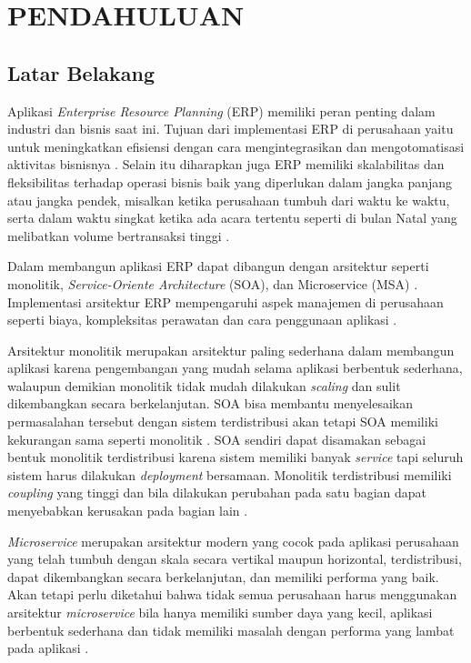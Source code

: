 \chapter{PENDAHULUAN}
\section{Latar Belakang}
Aplikasi \textit{Enterprise Resource Planning} (ERP) memiliki peran penting dalam industri dan bisnis saat ini. Tujuan dari implementasi ERP di perusahaan yaitu untuk meningkatkan efisiensi dengan cara mengintegrasikan dan mengotomatisasi aktivitas bisnisnya \cite{612}. Selain itu diharapkan juga ERP memiliki skalabilitas dan fleksibilitas terhadap operasi bisnis baik yang diperlukan dalam jangka panjang atau jangka pendek, misalkan ketika perusahaan tumbuh dari waktu ke waktu, serta dalam waktu singkat ketika ada acara tertentu seperti di bulan Natal yang melibatkan volume bertransaksi tinggi \cite{D94}.

Dalam membangun aplikasi ERP dapat dibangun dengan arsitektur seperti monolitik, \textit{Service-Oriente Architecture} (SOA), dan Microservice (MSA) \cite{5FA}. Implementasi arsitektur ERP mempengaruhi aspek manajemen di perusahaan seperti biaya, kompleksitas perawatan dan cara penggunaan aplikasi \cite{612}.

Arsitektur monolitik merupakan arsitektur paling sederhana dalam membangun aplikasi karena pengembangan yang mudah selama aplikasi berbentuk sederhana, walaupun demikian monolitik tidak mudah dilakukan \textit{scaling} dan sulit dikembangkan secara berkelanjutan. SOA bisa membantu menyelesaikan permasalahan tersebut dengan sistem terdistribusi akan tetapi SOA memiliki kekurangan sama seperti monolitik \cite{5FA}. SOA sendiri dapat disamakan sebagai bentuk monolitik terdistribusi karena sistem memiliki banyak \textit{service} tapi seluruh sistem harus dilakukan \textit{deployment} bersamaan. Monolitik terdistribusi memiliki  \textit{coupling} yang tinggi dan bila dilakukan perubahan pada satu bagian dapat menyebabkan kerusakan pada bagian lain \cite{74C}.

\textit{Microservice} merupakan arsitektur modern yang cocok pada aplikasi perusahaan yang telah tumbuh dengan skala secara vertikal maupun horizontal, terdistribusi, dapat dikembangkan secara berkelanjutan, dan memiliki performa yang baik. Akan tetapi perlu diketahui bahwa tidak semua perusahaan harus menggunakan arsitektur \textit{microservice} bila hanya memiliki sumber daya yang kecil, aplikasi berbentuk sederhana dan tidak memiliki masalah dengan performa yang lambat pada aplikasi \cite{5FA}.


